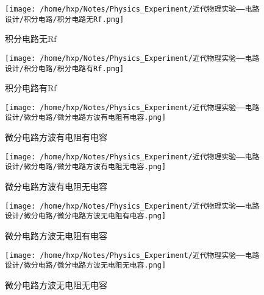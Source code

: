 \documentclass{article}
\begin{document}






\begin{figure}[H]
  \centering
  \texttt{[image: /home/hxp/Notes/Physics\_Experiment/近代物理实验——电路设计/积分电路/积分电路无Rf.png]}
  \caption{积分电路无Rf}
\end{figure}

\begin{figure}[H]
  \centering
  \texttt{[image: /home/hxp/Notes/Physics\_Experiment/近代物理实验——电路设计/积分电路/积分电路有Rf.png]}
  \caption{积分电路有Rf}
\end{figure}



\begin{figure}[H]
  \centering
  \texttt{[image: /home/hxp/Notes/Physics\_Experiment/近代物理实验——电路设计/微分电路/微分电路方波有电阻有电容.png]}
  \caption{微分电路方波有电阻有电容}
\end{figure}

\begin{figure}[H]
  \centering
  \texttt{[image: /home/hxp/Notes/Physics\_Experiment/近代物理实验——电路设计/微分电路/微分电路方波有电阻无电容.png]}
  \caption{微分电路方波有电阻无电容}
\end{figure}

\begin{figure}[H]
  \centering
  \texttt{[image: /home/hxp/Notes/Physics\_Experiment/近代物理实验——电路设计/微分电路/微分电路方波无电阻有电容.png]}
  \caption{微分电路方波无电阻有电容}
\end{figure}

\begin{figure}[H]
  \centering
  \texttt{[image: /home/hxp/Notes/Physics\_Experiment/近代物理实验——电路设计/微分电路/微分电路方波无电阻无电容.png]}
  \caption{微分电路方波无电阻无电容}
\end{figure}
\end{document}
